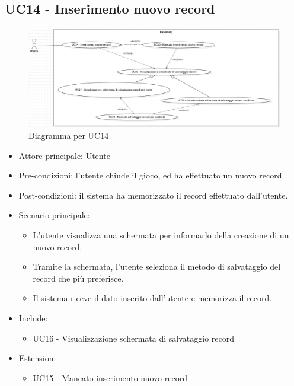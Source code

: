 \subsection{UC14 - Inserimento nuovo record}
\begin{figure}[h]
    \centering
    \includegraphics[width=410pt]{images/usecase/UC14.png}
    \caption{Diagramma per UC14}
    \label{fig:attore}
\end{figure}
\begin{itemize}
    \item Attore principale: Utente
    \item Pre-condizioni: l'utente chiude il gioco, ed ha effettuato un nuovo record.
    \item Post-condizioni: il sistema ha memorizzato il record effettuato dall'utente.
    \item Scenario principale: \begin{itemize}
        \item L'utente visualizza una schermata per informarlo della creazione di un nuovo record.
        \item Tramite la schermata, l'utente seleziona il metodo di salvataggio del record che più preferisce.
        \item Il sistema riceve il dato inserito dall'utente e memorizza il record.
    \end{itemize}
    \item Include: \begin{itemize}
        \item UC16 - Visualizzazione schermata di salvataggio record
    \end{itemize}
    \item Estensioni: \begin{itemize}
        \item UC15 - Mancato inserimento nuovo record 
    \end{itemize}
\end{itemize}

